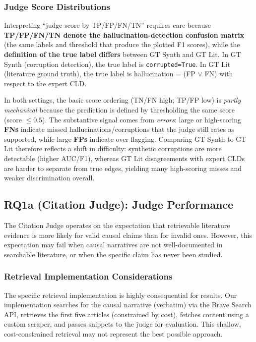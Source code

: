\subsubsection{Judge Score Distributions}

Interpreting ``judge score by TP/FP/FN/TN'' requires care because \textbf{TP/FP/FN/TN denote the hallucination-detection confusion matrix} (the same labels and threshold that produce the plotted F1 scores), while the \textbf{definition of the true label differs} between GT Synth and GT Lit. In GT Synth (corruption detection), the true label is \texttt{corrupted=True}. In GT Lit (literature ground truth), the true label is hallucination = (FP $\lor$ FN) with respect to the expert CLD.

In both settings, the basic score ordering (TN/FN high; TP/FP low) is \textit{partly mechanical} because the prediction is defined by thresholding the same score (score $\le 0.5$). The substantive signal comes from \textit{errors}: large or high-scoring \textbf{FNs} indicate missed hallucinations/corruptions that the judge still rates as supported, while large \textbf{FPs} indicate over-flagging. Comparing GT Synth to GT Lit therefore reflects a shift in difficulty: synthetic corruptions are more detectable (higher AUC/F1), whereas GT Lit disagreements with expert CLDs are harder to separate from true edges, yielding many high-scoring misses and weaker discrimination overall.

\subsection{RQ1a (Citation Judge): Judge Performance}
\label{sec:discussion_rq1a_citation}

The Citation Judge operates on the expectation that retrievable literature evidence is more likely for valid causal claims than for invalid ones. However, this expectation may fail when causal narratives are not well-documented in searchable literature, or when the specific claim has never been studied.

\subsubsection{Retrieval Implementation Considerations}

The specific retrieval implementation is highly consequential for results. Our implementation searches for the causal narrative (verbatim) via the Brave Search API, retrieves the first five articles (constrained by cost), fetches content using a custom scraper, and passes snippets to the judge for evaluation. This shallow, cost-constrained retrieval may not represent the best possible approach.

